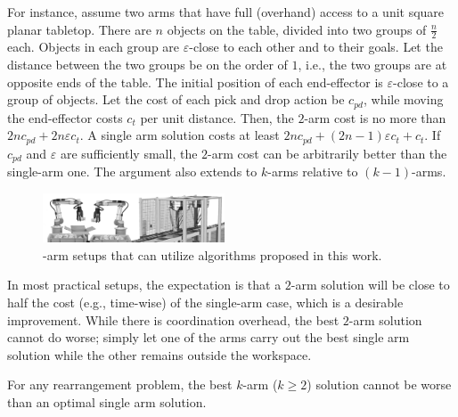 For instance, assume two arms that have full (overhand) access to a 
unit square planar tabletop. There are $n$ objects on the table, 
divided into two groups of $\frac{n}{2}$ each. Objects in each group 
are $\varepsilon$-close to each other and to their goals. Let the 
distance between the two groups be on the order of $1$, i.e., the two 
groups are at opposite ends of the table. The initial position of each 
end-effector is $\varepsilon$-close to a group of objects. Let the cost 
of each pick and drop action be $c_{pd}$, while moving the 
end-effector costs $c_t$ per unit distance. Then, the $2$-arm 
cost is no more than $2nc_{pd} + 2n\varepsilon c_t $.  A single arm 
solution costs at least $2nc_{pd} + (2n-1)\varepsilon c_t + 
c_t$. If $c_{pd}$ and $\varepsilon$ are sufficiently small, the $2$-arm 
cost can be arbitrarily better than the single-arm one. The argument 
also extends to $k$-arms relative to $(k-1)$-arms.



\begin{figure}[t]
	\centering
	\includegraphics[width=0.48\textwidth]{figures/two_arms}
	\caption{\Dual-arm setups that can utilize
	algorithms proposed in this work.}
	\label{fig:two_arms}
	\vspace{-0.25in}
\end{figure}



In most practical setups, the expectation is that a $2$-arm solution
will be close to half the cost (e.g., time-wise) of the single-arm 
case, which is a desirable improvement. While there 
is coordination overhead, the best $2$-arm solution cannot do worse; simply 
let one of the arms carry out the best single arm solution while the 
other remains outside the workspace. 

\begin{observation}\label{l:2-arm-no-worse}
For any rearrangement problem, the best $k$-arm ($k \ge 2$) solution
cannot be worse than an optimal single arm solution.
\end{observation}



